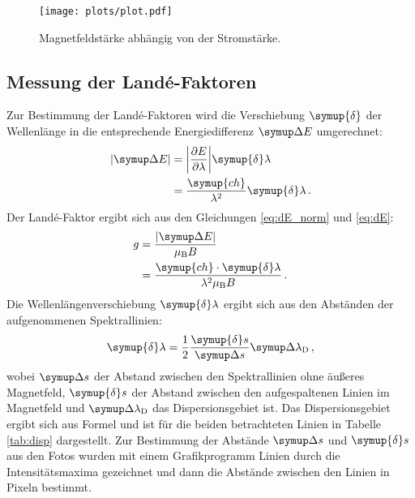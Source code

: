 \begin{figure}
  \centering
  \texttt{[image: plots/plot.pdf]}
  \caption{Magnetfeldstärke abhängig von der Stromstärke.}
  \label{fig:plot}
\end{figure}

\subsection{Messung der Landé-Faktoren}
Zur Bestimmung der Landé-Faktoren wird die Verschiebung $\symup{\delta}$ der Wellenlänge in die entsprechende Energiedifferenz $\upD E$ umgerechnet:
\begin{align}
  |\upD E| &= \biggl|\frac{\partial E}{\partial\lambda}\biggr|\symup{\delta}\lambda \\
          &= \frac{\symup{ch}}{\lambda^2}\symup{\delta}\lambda \,.
  \label{eq:dE}
\end{align}
Der Landé-Faktor ergibt sich aus den Gleichungen \eqref{eq:dE_norm} und \eqref{eq:dE}:
\begin{align}
  g &= \frac{|\upD E|}{\mu_\text{B} B} \\
    &= \frac{\symup{ch}\cdot\symup{\delta}\lambda}{\lambda^2\mu_\text{B}B}\,.
\end{align}
Die Wellenlängenverschiebung $\symup{\delta}\lambda$ ergibt sich aus den Abständen der aufgenommenen Spektrallinien:
\begin{equation}
  \symup{\delta}\lambda = \frac{1}{2}\frac{\symup{\delta}s}{\upD s}\upD \lambda_\text{D}\,,
  \label{eq:versch}
\end{equation}
wobei $\upD s$ der Abstand zwischen den Spektrallinien ohne äußeres Magnetfeld, $\symup{\delta} s$ der Abstand zwischen den aufgespaltenen Linien
im Magnetfeld und $\upD\lambda_\text{D}$ das Dispersionsgebiet ist.
Das Dispersionsgebiet ergibt sich aus Formel %
und ist für die beiden betrachteten Linien in Tabelle \ref{tab:disp} dargestellt.
Zur Bestimmung der Abstände $\upD s$ und $\symup{\delta}s$ aus den Fotos wurden mit einem Grafikprogramm Linien durch die Intensitätsmaxima gezeichnet
und dann die Abstände zwischen den Linien in Pixeln bestimmt.

